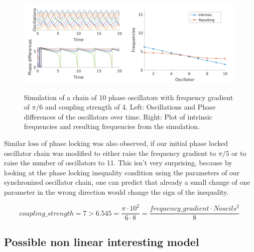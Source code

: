 \documentclass[a4paper]{scrartcl}
\begin{document}
\begin{figure}[!h]
	\centering
	\includegraphics[width=0.5\textwidth]{fig/chain_phase_oscil-6a_unstable.png}\includegraphics[width=0.5\textwidth]{fig/chain_phase_oscil_freq-6a_unstable.png}
	\caption{Simulation of a chain of 10 phase oscillators with frequency gradient of $\pi /6$ and coupling strength of 4. Left: Oscillations and Phase differences of the oscillators over time. Right: Plot of intrinsic frequencies and resulting frequencies from the simulation.}
\end{figure}

Similar loss of phase locking was also observed, if our initial phase locked oscillator chain was modified to either raise the frequency gradient to $\pi /5$ or to raise the number of oscillators to 11. This isn't very surprising, because by looking at the phase locking inequality condition using the parameters of our synchronized oscillator chain, one can predict that already a small change of one parameter in the wrong direction would change the sign of the inequality.

\begin{equation}
	coupling \_ strength = 7 > 6.545 =\frac{\pi \cdot 10^{2}}{6 \cdot 8} = \frac{frequency \_ gradient \cdot Noscils^2}{8}
\end{equation}


\newpage

\subsection{Possible non linear interesting model}
\end{document}
